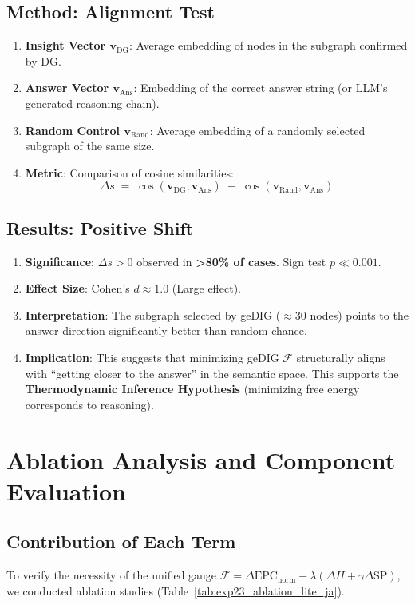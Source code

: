 \documentclass[12pt]{article}
\newcommand{\F}{\mathcal{F}}
\newcommand{\gednorm}{\Delta\mathrm{EPC}_{\mathrm{norm}}}
\begin{document}
\subsection{Method: Alignment Test}
\begin{enumerate}
    \item \textbf{Insight Vector $\mathbf{v}_{\mathrm{DG}}$}: Average embedding of nodes in the subgraph confirmed by DG.
    \item \textbf{Answer Vector $\mathbf{v}_{\mathrm{Ans}}$}: Embedding of the correct answer string (or LLM's generated reasoning chain).
    \item \textbf{Random Control $\mathbf{v}_{\mathrm{Rand}}$}: Average embedding of a randomly selected subgraph of the same size.
    \item \textbf{Metric}: Comparison of cosine similarities:
    \[
        \Delta s \;=\; \cos(\mathbf{v}_{\mathrm{DG}}, \mathbf{v}_{\mathrm{Ans}}) \;-\; \cos(\mathbf{v}_{\mathrm{Rand}}, \mathbf{v}_{\mathrm{Ans}})
    \]
\end{enumerate}

\subsection{Results: Positive Shift}
\begin{enumerate}
    \item \textbf{Significance}: $\Delta s > 0$ observed in \textbf{>80\% of cases}. Sign test $p \ll 0.001$.
    \item \textbf{Effect Size}: Cohen's $d \approx 1.0$ (Large effect).
    \item \textbf{Interpretation}: The subgraph selected by geDIG ($\approx 30$ nodes) points to the answer direction significantly better than random chance.
    \item \textbf{Implication}: This suggests that minimizing geDIG $\F$ structurally aligns with ``getting closer to the answer'' in the semantic space. This supports the \textbf{Thermodynamic Inference Hypothesis} (minimizing free energy corresponds to reasoning).
\end{enumerate}

\section{Ablation Analysis and Component Evaluation}
\label{sec:ablation_analysis}

\subsection{Contribution of Each Term}
To verify the necessity of the unified gauge $\F = \gednorm - \lambda(\Delta H + \gamma \Delta \mathrm{SP})$, we conducted ablation studies (Table~\ref{tab:exp23_ablation_lite_ja}).
\end{document}
